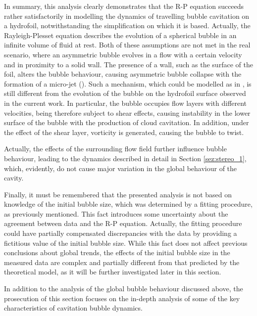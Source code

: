 In summary, this analysis clearly demonstrates that the R-P equation succeeds rather satisfactorily in modelling the dynamics of travelling bubble cavitation on a hydrofoil, notwithstanding the simplification on which it is based.
Actually, the Rayleigh-Plesset equation describes the evolution of a spherical bubble in an infinite volume of fluid at rest. Both of these assumptions are not met in the real scenario, where an asymmetric bubble evolves in a flow with a certain velocity and in proximity to a solid wall. 
The presence of a wall, such as the surface of the foil, alters the bubble behaviour, causing asymmetric bubble collapse with the formation of a micro-jet (\cite{franc2006fundamentals}). 
Such a mechanism, which could be modelled as in \cite{Plesset1971}, is still different from the evolution of the bubble on the hydrofoil surface observed in the current work. 
In particular, the bubble occupies flow layers with different velocities, being therefore subject to shear effects, causing instability in the lower surface of the bubble with the production of cloud cavitation. 
In addition, under the effect of the shear layer, vorticity is generated, causing the bubble to twist. 

Actually, the effects of the surrounding flow field further influence bubble behaviour, leading to the dynamics described in detail in Section \ref{sez:stereo_1}, which, evidently, do not cause major variation in the global behaviour of the cavity. 

Finally, it must be remembered that the presented analysis is not based on knowledge of the initial bubble size, which was determined by a fitting procedure, as previously mentioned. This fact introduces some uncertainty about the agreement between data and the R-P equation. Actually, the fitting procedure could have partially compensated discrepancies with the data by providing a fictitious value of the initial bubble size. While this fact does not affect previous conclusions about global trends, the effects of the initial bubble size in the measured data are complex and partially different from that predicted by the theoretical model, as it will be further investigated later in this section. 

In addition to the analysis of the global bubble behaviour discussed above, the prosecution of this section focuses on the in-depth analysis of some of the key characteristics of cavitation bubble dynamics.

